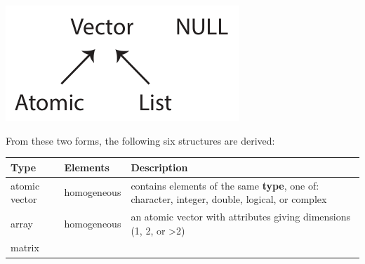 \documentclass[]{book}
\begin{document}
\includegraphics{R/RDataWrangling/images/summary_tree.png}

From these two forms, the following six structures are derived:

\begin{longtable}[]{@{}lll@{}}
\toprule
\begin{minipage}[b]{0.10\columnwidth}\raggedright
Type\strut
\end{minipage} & \begin{minipage}[b]{0.10\columnwidth}\raggedright
Elements\strut
\end{minipage} & \begin{minipage}[b]{0.71\columnwidth}\raggedright
Description\strut
\end{minipage}\tabularnewline
\midrule
\endhead
\begin{minipage}[t]{0.10\columnwidth}\raggedright
atomic vector\strut
\end{minipage} & \begin{minipage}[t]{0.10\columnwidth}\raggedright
homogeneous\strut
\end{minipage} & \begin{minipage}[t]{0.71\columnwidth}\raggedright
contains elements of the same \textbf{type}, one of: character, integer, double, logical, or complex\strut
\end{minipage}\tabularnewline
\begin{minipage}[t]{0.10\columnwidth}\raggedright
array\strut
\end{minipage} & \begin{minipage}[t]{0.10\columnwidth}\raggedright
homogeneous\strut
\end{minipage} & \begin{minipage}[t]{0.71\columnwidth}\raggedright
an atomic vector with attributes giving dimensions (1, 2, or \textgreater2)\strut
\end{minipage}\tabularnewline
\begin{minipage}[t]{0.10\columnwidth}\raggedright
matrix\strut
\end{minipage} & \begin{minipage}[t]{0.10\columnwidth}\raggedright

\end{minipage}
\end{longtable}
\end{document}
